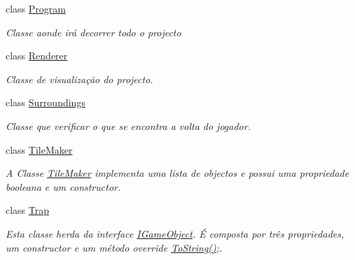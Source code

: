 \begin{DoxyCompactItemize}
class \mbox{\hyperlink{class_projeto2___l_p1_1_1_program}{Program}}
\begin{DoxyCompactList}\small\item\em Classe aonde irá decorrer todo o projecto \end{DoxyCompactList}\item 
class \mbox{\hyperlink{class_projeto2___l_p1_1_1_renderer}{Renderer}}
\begin{DoxyCompactList}\small\item\em Classe de visualização do projecto. \end{DoxyCompactList}\item 
class \mbox{\hyperlink{class_projeto2___l_p1_1_1_surroundings}{Surroundings}}
\begin{DoxyCompactList}\small\item\em Classe que verificar o que se encontra a volta do jogador. \end{DoxyCompactList}\item 
class \mbox{\hyperlink{class_projeto2___l_p1_1_1_tile_maker}{Tile\+Maker}}
\begin{DoxyCompactList}\small\item\em A Classe \mbox{\hyperlink{class_projeto2___l_p1_1_1_tile_maker}{Tile\+Maker}} implementa uma lista de objectos e possui uma propriedade booleana e um constructor. \end{DoxyCompactList}\item 
class \mbox{\hyperlink{class_projeto2___l_p1_1_1_trap}{Trap}}
\begin{DoxyCompactList}\small\item\em Esta classe herda da interface \mbox{\hyperlink{interface_projeto2___l_p1_1_1_i_game_object}{I\+Game\+Object}}. É composta por três propriedades, um constructor e um método override \mbox{\hyperlink{class_projeto2___l_p1_1_1_trap_a1abb25aa0b1f0b59026e9985a14875bf}{To\+String()}};. \end{DoxyCompactList}\end{DoxyCompactItemize}
